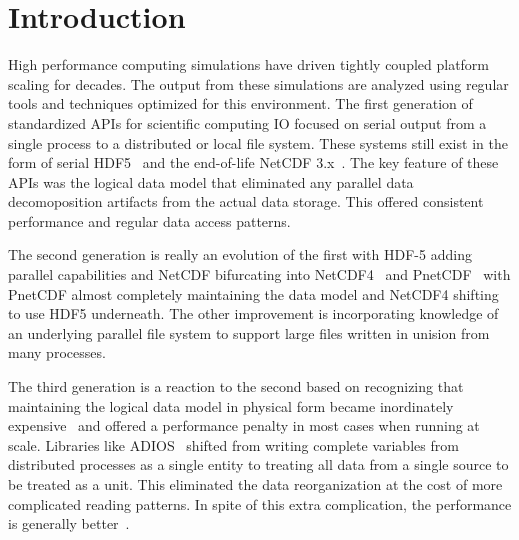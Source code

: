 \documentclass[letterpaper,twocolumn,10pt]{article}
\begin{document}
\section{Introduction}

High performance computing simulations have driven tightly coupled platform
scaling for decades. The output from these simulations are analyzed using
regular tools and techniques optimized for this environment.  The first
generation of standardized APIs for scientific computing IO focused on serial
output from a single process to a distributed or local file system.  These
systems still exist in the form of serial
HDF5~\cite{chilan:2006:hdf5-performance} and the end-of-life NetCDF
3.x~\cite{netcdf3}. The key feature of these APIs was the logical data model
that eliminated any parallel data decomoposition artifacts from the actual data
storage. This offered consistent performance and regular data access patterns.

The second generation is really an evolution of the first with HDF-5 adding
parallel capabilities and NetCDF bifurcating into
NetCDF4~\cite{rew:2011:netcdf-guide} and PnetCDF~\cite{torrellas:2003:pnetcdf}
with PnetCDF almost completely maintaining the data model and NetCDF4 shifting
to use HDF5 underneath. The other improvement is incorporating knowledge of an
underlying parallel file system to support large files written in unision from
many processes.

The third generation is a reaction to the second based on recognizing that
maintaining the logical data model in physical form became inordinately
expensive~\cite{lofstead:2011:six-degrees} and offered a performance penalty in
most cases when running at scale. Libraries like
ADIOS~\cite{lofstead:2009:adaptable} shifted from writing complete variables
from distributed processes as a single entity to treating all data from a
single source to be treated as a unit. This eliminated the data reorganization
at the cost of more complicated reading patterns. In spite of this extra
complication, the performance is generally
better~\cite{lofstead:2011:six-degrees}.
\end{document}

